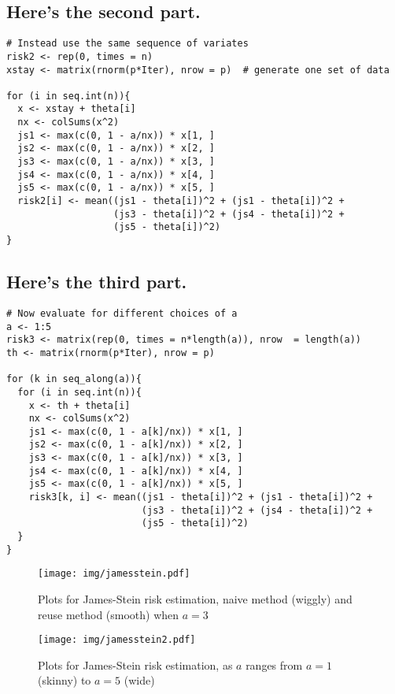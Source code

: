 \documentclass[11pt,english]{article}
\begin{document}
\subsection*{Here's the second part.}
\label{sec-1-2}



\begin{verbatim}
# Instead use the same sequence of variates
risk2 <- rep(0, times = n)
xstay <- matrix(rnorm(p*Iter), nrow = p)  # generate one set of data

for (i in seq.int(n)){
  x <- xstay + theta[i]
  nx <- colSums(x^2)
  js1 <- max(c(0, 1 - a/nx)) * x[1, ]
  js2 <- max(c(0, 1 - a/nx)) * x[2, ]
  js3 <- max(c(0, 1 - a/nx)) * x[3, ]
  js4 <- max(c(0, 1 - a/nx)) * x[4, ]
  js5 <- max(c(0, 1 - a/nx)) * x[5, ]
  risk2[i] <- mean((js1 - theta[i])^2 + (js1 - theta[i])^2 + 
                   (js3 - theta[i])^2 + (js4 - theta[i])^2 + 
                   (js5 - theta[i])^2)
}
\end{verbatim}
\subsection*{Here's the third part.}
\label{sec-1-3}



\begin{verbatim}
# Now evaluate for different choices of a
a <- 1:5
risk3 <- matrix(rep(0, times = n*length(a)), nrow  = length(a))
th <- matrix(rnorm(p*Iter), nrow = p)

for (k in seq_along(a)){
  for (i in seq.int(n)){
    x <- th + theta[i]
    nx <- colSums(x^2)
    js1 <- max(c(0, 1 - a[k]/nx)) * x[1, ]
    js2 <- max(c(0, 1 - a[k]/nx)) * x[2, ]
    js3 <- max(c(0, 1 - a[k]/nx)) * x[3, ]
    js4 <- max(c(0, 1 - a[k]/nx)) * x[4, ]
    js5 <- max(c(0, 1 - a[k]/nx)) * x[5, ]
    risk3[k, i] <- mean((js1 - theta[i])^2 + (js1 - theta[i])^2 + 
                        (js3 - theta[i])^2 + (js4 - theta[i])^2 + 
                        (js5 - theta[i])^2)
  }
}
\end{verbatim}






\begin{figure}[h!]
\centering
\texttt{[image: img/jamesstein.pdf]}
\caption{\label{fig:yplot}Plots for James-Stein risk estimation, naive method (wiggly) and reuse method (smooth) when $a = 3$}
\end{figure}




\begin{figure}[h!]
\centering
\texttt{[image: img/jamesstein2.pdf]}
\caption{\label{fig:yplot}Plots for James-Stein risk estimation, as $a$ ranges from $a = 1$ (skinny) to $a = 5$ (wide)}
\end{figure}
\end{document}
